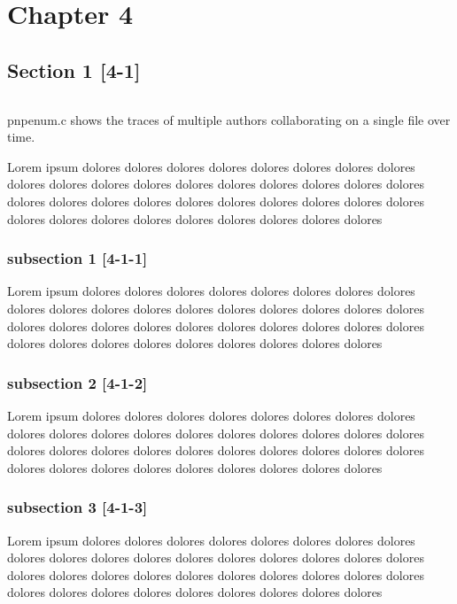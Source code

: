 \chapter{Chapter 4}
\label{chap:sibling4}

\section{Section 1 [4-1]}
\label{sec:31section}

\begin{listing}
    \inputminted{c}{./corpus/enum.c}
    \caption{pnpenum.c shows the traces of multiple authors collaborating on a single file over time.}
    \label{code:enum_c}
\end{listing}

Lorem ipsum dolores dolores dolores dolores dolores dolores dolores dolores dolores dolores dolores dolores dolores dolores dolores dolores dolores dolores dolores dolores dolores dolores dolores dolores dolores dolores dolores dolores dolores dolores dolores dolores dolores dolores dolores dolores dolores

\subsection{subsection 1 [4-1-1]}
\label{subsec:311subsection}
Lorem ipsum dolores dolores dolores dolores dolores dolores dolores dolores dolores dolores dolores dolores dolores dolores dolores dolores dolores dolores dolores dolores dolores dolores dolores dolores dolores dolores dolores dolores dolores dolores dolores dolores dolores dolores dolores dolores dolores

\subsection{subsection 2 [4-1-2]}
\label{subsec:312sibling-subsection}
Lorem ipsum dolores dolores dolores dolores dolores dolores dolores dolores dolores dolores dolores dolores dolores dolores dolores dolores dolores dolores dolores dolores dolores dolores dolores dolores dolores dolores dolores dolores dolores dolores dolores dolores dolores dolores dolores dolores dolores

\subsection{subsection 3 [4-1-3]}
\label{subsec:313sibling-subsection}
Lorem ipsum dolores dolores dolores dolores dolores dolores dolores dolores dolores dolores dolores dolores dolores dolores dolores dolores dolores dolores dolores dolores dolores dolores dolores dolores dolores dolores dolores dolores dolores dolores dolores dolores dolores dolores dolores dolores dolores

